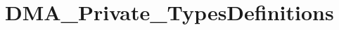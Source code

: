 \hypertarget{group___d_m_a___private___types_definitions}{\section{D\-M\-A\-\_\-\-Private\-\_\-\-Types\-Definitions}
\label{group___d_m_a___private___types_definitions}
}
